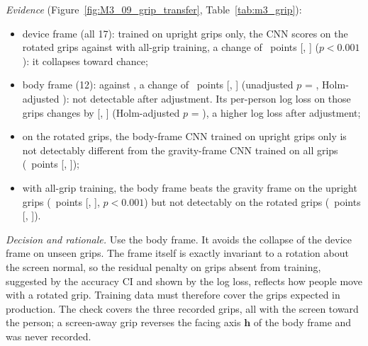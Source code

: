 \emph{Evidence} (Figure~\ref{fig:M3_09_grip_transfer}, Table~\ref{tab:m3_grip}):
\begin{itemize}
  \item device frame (all 17): trained on upright grips only, the CNN scores  on the rotated grips against  with all-grip training, a change of ~points [, ] ($p < 0.001$): it collapses toward chance;
  \item body frame (12):  against , a change of ~points [, ] (unadjusted $p$ = , Holm-adjusted ): not detectable after adjustment. Its per-person log loss on those grips changes by  [, ] (Holm-adjusted $p$ = ), a higher log loss after adjustment;
  \item on the rotated grips, the body-frame CNN trained on upright grips only is not detectably different from the gravity-frame CNN trained on all grips (~points [, ]);
  \item with all-grip training, the body frame beats the gravity frame on the upright grips (~points [, ], $p < 0.001$) but not detectably on the rotated grips (~points [, ]).
\end{itemize}

\emph{Decision and rationale.} Use the body frame. It avoids the collapse of the device frame on unseen grips.
The frame itself is exactly invariant to a rotation about the screen normal, so the residual penalty on grips absent from training, suggested by the accuracy CI and shown by the log loss, reflects how people move with a rotated grip.
Training data must therefore cover the grips expected in production.
The check covers the three recorded grips, all with the screen toward the person; a screen-away grip reverses the facing axis $\mathbf{h}$ of the body frame and was never recorded.

